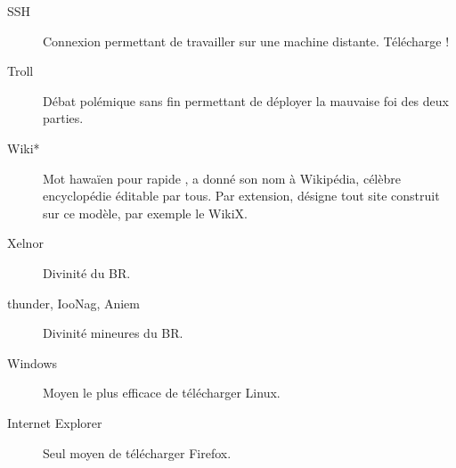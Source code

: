 \begin{description}
  \item[SSH] Connexion permettant de travailler sur une machine distante. Télécharge  !
  
  \item[Troll] Débat polémique sans fin permettant de déployer la mauvaise foi des deux parties.

  
  
  \item[Wiki*] Mot hawa\"ien pour \og rapide \fg, a donné son nom à Wikipédia, célèbre encyclopédie éditable par tous.
  Par extension, désigne tout site construit sur ce modèle, par exemple le WikiX.%
  
  \item[Xelnor] Divinité du BR.
  
  \item[thunder, IooNag, Aniem] Divinité mineures du BR.
  
  \item[Windows] Moyen le plus efficace de télécharger Linux.
  
  \item[Internet Explorer] Seul moyen de télécharger Firefox.
  
\end{description}
